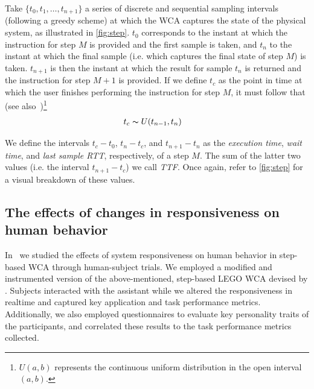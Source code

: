 Take \( \{ t_0, t_1, \ldots, t_{n + 1} \} \) a series of discrete and sequential sampling intervals (following a greedy scheme) at which the \ac{WCA} captures the state of the physical system, as illustrated in \cref{fig:step}.
\( t_0 \) corresponds to the instant at which the instruction for step \( M \) is provided and the first sample is taken, and \( t_n \) to the instant at which the final sample (i.e. which captures the final state of step \( M \)) is taken. 
\( t_{n + 1} \) is then the instant at which the result for sample \( t_n \) is returned and the instruction for step \( M + 1 \) is provided.
If we define \( t_c \) as the point in time at which the user finishes performing the instruction for step \( M \), it must follow that (see also~\cite{olguinmunoz:impact2021})\footnote{\( U(a, b) \) represents the continuous uniform distribution in the open interval \( (a, b) \).}
\begin{align}\label{eq:tc}
    t_c &\thicksim U(t_{n - 1}, t_n)
\end{align}

We define the intervals \( t_c - t_0 \), \( t_n - t_c \), and \( t_{n + 1} - t_n \) as the \emph{execution time}, \emph{wait time}, and \emph{last sample \ac{RTT}}, respectively, of a step \( M \).
The sum of the latter two values (i.e. the interval \( t_{n + 1} - t_c \)) we call \emph{\ac{TTF}}.
Once again, refer to \cref{fig:step} for a visual breakdown of these values.

\subsection{The effects of changes in responsiveness on human behavior}\label{ssec:plos}

In~\cite{olguinmunoz:impact2021} we studied the effects of system responsiveness on human behavior in step-based \ac{WCA} through human-subject trials.
We employed a modified and instrumented version of the above-mentioned, step-based LEGO \ac{WCA} devised by \textcite{Chen2015LEGO}.
Subjects interacted with the assistant while we altered the responsiveness in realtime and captured key application and task performance metrics.
Additionally, we also employed questionnaires to evaluate key personality traits of the participants, and correlated these results to the task performance metrics collected.

